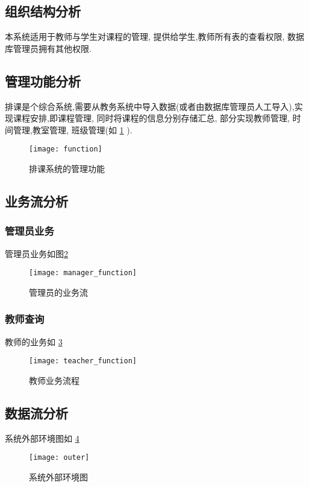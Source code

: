 \documentclass{myreport}
\begin{document}
  \subsection{组织结构分析}
    本系统适用于教师与学生对课程的管理, 提供给学生,教师所有表的查看权限, 数据库管理员拥有其他权限.

  \subsection{管理功能分析}
    排课是个综合系统,需要从教务系统中导入数据(或者由数据库管理员人工导入),实现课程安排,即课程管理, 同时将课程的信息分别存储汇总, 部分实现教师管理, 时间管理,教室管理, 班级管理(如    \cref{fig:function}
    ).
    \begin{figure}[H]
      \centering
      \texttt{[image: function]}
      \caption{排课系统的管理功能}
      \label{fig:function}
    \end{figure}

  \subsection{业务流分析}
    \subsubsection{管理员业务}
      管理员业务如图\cref{fig:manager_function}
      \begin{figure}[H]
        \centering
        \texttt{[image: manager\_function]}
        \caption{管理员的业务流}
        \label{fig:manager_function}
      \end{figure}
    \subsubsection{教师查询}
      教师的业务如
      \cref{fig:teacher_function}
      \begin{figure}[H]
        \centering
        \texttt{[image: teacher\_function]}
        \caption{教师业务流程}
        \label{fig:teacher_function}
      \end{figure}

  \subsection{数据流分析}
    系统外部环境图如
    \cref{fig:outer}
    \begin{figure}[H]
      \centering
      \texttt{[image: outer]}
      \caption{系统外部环境图}
      \label{fig:outer}
    \end{figure}
\end{document}
